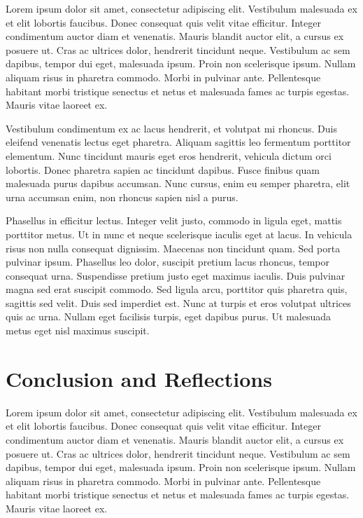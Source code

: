\documentclass[8pt]{article}
\begin{document}
\begin{multicols}{2}
Lorem ipsum dolor sit amet, consectetur adipiscing elit. Vestibulum malesuada ex et elit lobortis faucibus. Donec consequat quis velit vitae efficitur. Integer condimentum auctor diam et venenatis. Mauris blandit auctor elit, a cursus ex posuere ut. Cras ac ultrices dolor, hendrerit tincidunt neque. Vestibulum ac sem dapibus, tempor dui eget, malesuada ipsum. Proin non scelerisque ipsum. Nullam aliquam risus in pharetra commodo. Morbi in pulvinar ante. Pellentesque habitant morbi tristique senectus et netus et malesuada fames ac turpis egestas. Mauris vitae laoreet ex.

Vestibulum condimentum ex ac lacus hendrerit, et volutpat mi rhoncus. Duis eleifend venenatis lectus eget pharetra. Aliquam sagittis leo fermentum porttitor elementum. Nunc tincidunt mauris eget eros hendrerit, vehicula dictum orci lobortis. Donec pharetra sapien ac tincidunt dapibus. Fusce finibus quam malesuada purus dapibus accumsan. Nunc cursus, enim eu semper pharetra, elit urna accumsan enim, non rhoncus sapien nisl a purus.

Phasellus in efficitur lectus. Integer velit justo, commodo in ligula eget, mattis porttitor metus. Ut in nunc et neque scelerisque iaculis eget at lacus. In vehicula risus non nulla consequat dignissim. Maecenas non tincidunt quam. Sed porta pulvinar ipsum. Phasellus leo dolor, suscipit pretium lacus rhoncus, tempor consequat urna. Suspendisse pretium justo eget maximus iaculis. Duis pulvinar magna sed erat suscipit commodo. Sed ligula arcu, porttitor quis pharetra quis, sagittis sed velit. Duis sed imperdiet est. Nunc at turpis et eros volutpat ultrices quis ac urna. Nullam eget facilisis turpis, eget dapibus purus. Ut malesuada metus eget nisl maximus suscipit. 

\section{Conclusion and Reflections}

 Lorem ipsum dolor sit amet, consectetur adipiscing elit. Vestibulum malesuada ex et elit lobortis faucibus. Donec consequat quis velit vitae efficitur. Integer condimentum auctor diam et venenatis. Mauris blandit auctor elit, a cursus ex posuere ut. Cras ac ultrices dolor, hendrerit tincidunt neque. Vestibulum ac sem dapibus, tempor dui eget, malesuada ipsum. Proin non scelerisque ipsum. Nullam aliquam risus in pharetra commodo. Morbi in pulvinar ante. Pellentesque habitant morbi tristique senectus et netus et malesuada fames ac turpis egestas. Mauris vitae laoreet ex.


\end{multicols}
\end{document}
